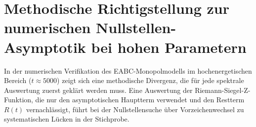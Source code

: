 


\newcommand{\monopolQtot}{1796}
\newcommand{\monopolFactor}{1036.92} %
\newcommand{\monopolPressureNorm}{0.032292} %

\newcommand{\convFiftyVar}{0.172806}
\newcommand{\convFiftyDelta}{0.068616}
\newcommand{\convFiftyMean}{0.992296}
\newcommand{\convHundredVar}{0.155540}
\newcommand{\convHundredDelta}{0.051350}
\newcommand{\convHundredMean}{0.995738}
\newcommand{\convTwoHundredVar}{0.160372}
\newcommand{\convTwoHundredDelta}{0.056182}
\newcommand{\convTwoHundredMean}{0.998893}

\newcommand{\badMeanFixed}{2.9586}
\newcommand{\badVarFixed}{7.33}
\newcommand{\badMeanAdapt}{2.9962}
\newcommand{\badVarAdapt}{7.88}
\newcommand{\badCountInterval}{52}
\newcommand{\goodCountInterval}{150}

\section{Methodische Richtigstellung zur numerischen Nullstellen-Asymptotik bei hohen Parametern}
\label{sec:methodische-richtigstellung}

In der numerischen Verifikation des EABC-Monopolmodells im hochenergetischen Bereich
($t \approx 5000$) zeigt sich eine methodische Divergenz, die für jede spektrale
Auswertung zuerst geklärt werden muss.
Eine Auswertung der Riemann-Siegel-Z-Funktion, die nur den asymptotischen Hauptterm
verwendet und den Restterm $R(t)$ vernachlässigt, führt bei der Nullstellensuche
über Vorzeichenwechsel zu systematischen Lücken in der Stichprobe.

